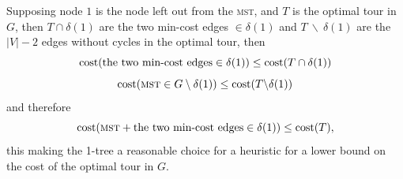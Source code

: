 Supposing node $1$ is the node left out from the \textsc{mst}, %
and $T$ is the optimal tour in $G$, then $T \cap \delta(1)$ are the two min-cost edges $\in \delta(1)$ 
and $T\: \backslash\: \delta(1)$ are the $|V|-2$ edges without cycles in the optimal tour, then
$$\mbox{cost}(\mbox{the two min-cost edges} \in \delta(1)) \leq \mbox{cost}(T \cap \delta(1))$$
$$\mbox{cost}(\mbox{\textsc{mst}} \in G\: \backslash\: \delta(1)) \leq \mbox{cost}(T \backslash \delta(1))$$
and therefore
$$\mbox{cost}(\mbox{\textsc{mst}}+\mbox{the two min-cost edges} \in \delta(1)) \leq \mbox{cost}(T),$$
this making the 1-tree a reasonable choice for a heuristic for a lower bound on the cost of the optimal tour in $G$.
